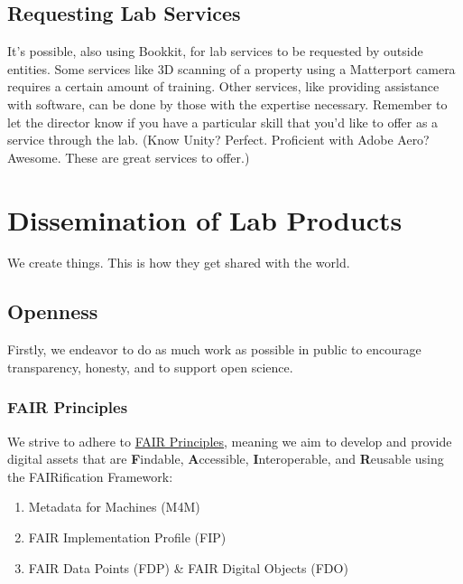 \documentclass[]{tufte-book}
\providecommand{\tightlist}{%
  \setlength{\itemsep}{0pt}\setlength{\parskip}{0pt}}
\begin{document}
\hypertarget{requesting-lab-services}{%
\section{Requesting Lab Services}\label{requesting-lab-services}}

It's possible, also using Bookkit, for lab services to be requested by outside entities. Some services like 3D scanning of a property using a Matterport camera requires a certain amount of training. Other services, like providing assistance with software, can be done by those with the expertise necessary. Remember to let the director know if you have a particular skill that you'd like to offer as a service through the lab. (Know Unity? Perfect. Proficient with Adobe Aero? Awesome. These are great services to offer.)

\hypertarget{diss}{%
\chapter{Dissemination of Lab Products}\label{diss}}

We create things. This is how they get shared with the world.

\hypertarget{openness}{%
\section{Openness}\label{openness}}

Firstly, we endeavor to do as much work as possible in public to encourage transparency, honesty, and to support open science.

\hypertarget{fair-principles}{%
\subsection{FAIR Principles}\label{fair-principles}}

We strive to adhere to \href{https://www.go-fair.org/fair-principles/}{FAIR Principles}, meaning we aim to develop and provide digital assets that are \textbf{F}indable, \textbf{A}ccessible, \textbf{I}nteroperable, and \textbf{R}eusable using the FAIRification Framework:

\begin{enumerate}
\def\labelenumi{\arabic{enumi}.}
\tightlist
\item
  Metadata for Machines (M4M)
\item
  FAIR Implementation Profile (FIP)
\item
  FAIR Data Points (FDP) \& FAIR Digital Objects (FDO)
\end{enumerate}
\end{document}
